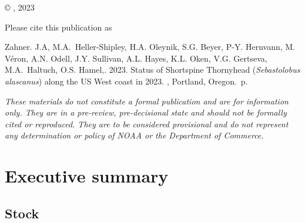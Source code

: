 \documentclass[11pt,
  letterpaper,
]{article}
\newcommand{\trTitle}{Status of Shortspine Thornyhead (\emph{Sebastolobus alascanus}) along the US West coast in 2023}
\newcommand{\trYear}{2023}
\newcommand{\trAuthsBack}{Zahner. J.A, M.A.~Heller-Shipley, H.A. Oleynik, S.G. Beyer, P-Y. Hernvann, M. Véron, A.N. Odell, J.Y. Sullivan, A.L. Hayes, K.L. Oken, V.G. Gertseva, M.A.~Haltuch, O.S. Hamel,}
\newcommand{\trCitation}{
\begin{hangparas}{1em}{1}
\trAuthsBack{}. \trYear{}. \trTitle{}. \glsentrylong{pfmc}, Portland, Oregon. \pageref{LastPage}{}\,p.
\end{hangparas}}
\begin{document}
\thispagestyle{empty}
\vspace*{\fill}
\begin{center}
\copyright{} , \trYear{}\\
\end{center}
\par
\bigskip
\noindent
\bigskip
\par
Please cite this publication as

\trCitation{}

\clearpage


\tableofcontents\clearpage
\label{TRlastRoman}
\clearpage

\newpage
\thispagestyle{empty} %

\pagestyle{plain}  %
\renewcommand*{\thefootnote}{\arabic{footnote}}  %
\setcounter{footnote}{0}  %
\renewcommand{\headrulewidth}{0.5pt}
\renewcommand{\footrulewidth}{0.5pt}

\newcommand{\lt}{\ensuremath <}
\newcommand{\gt}{\ensuremath >}

\emph{These materials do not constitute a formal publication and are for information only. They are in a pre-review, pre-decisional state and should not be formally cited or reproduced. They are to be considered provisional and do not represent any determination or policy of NOAA or the Department of Commerce.}

\pagebreak
{}
\setcounter{page}{1}

\renewcommand{\thetable}{\roman{table}}
\renewcommand{\thefigure}{\roman{figure}}

\setlength\parskip{0.5em plus 0.1em minus 0.2em}

\hypertarget{executive-summary}{%
\section*{Executive summary}\label{executive-summary}}

\hypertarget{stock}{%
\subsection*{Stock}\label{stock}}
\end{document}
